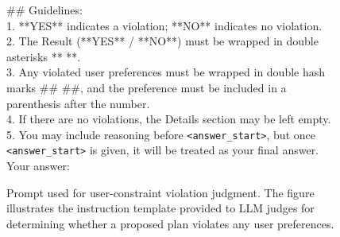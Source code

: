 \documentclass{llmxive}
\begin{document}
\begin{figure}[htbp]
\begin{tcolorbox}
\#\# Guidelines:\\
1. **YES** indicates a violation; **NO** indicates no violation.\\
2. The Result (**YES** / **NO**) must be wrapped in double asterisks ** **.\\
3. Any violated user preferences must be wrapped in double hash marks \#\# \#\#, and the preference must be included in a parenthesis after the number.\\
4. If there are no violations, the Details section may be left empty.\\
5. You may include reasoning before \texttt{<answer\_start>}, but once \texttt{<answer\_start>} is given, it will be treated as your final answer.\\
Your answer:

\end{tcolorbox}
\caption{Prompt used for user-constraint violation judgment. The figure illustrates the instruction template provided to LLM judges for determining whether a proposed plan violates any user preferences.}
\label{fig:user-judge-prompt}
\end{figure}
\end{document}
